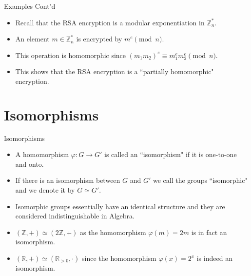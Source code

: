 \documentclass[ %
 10pt, xcolor={dvipsnames,svgnames,x11names,hyperref},
   hyperref={colorlinks=true,citecolor=green,linkcolor=DarkRed,urlcolor=ProcessBlue,anchorcolor=blue}
  ]{beamer}
\newenvironment{stepitemize}{\begin{itemize}[<+->]}{\end{itemize} }
\newcommand{\Z}{\mathbb{Z}}
\newcommand{\R}{\mathbb{R}}
\begin{document}
\begin{frame}{Examples Cont'd}
    \begin{stepitemize}
\item Recall that the RSA encryption is a modular exponentiation in $\Z_n^{*}$.
\item An element $m\in \Z_n^*$ is encrypted by $m^e 
\pmod{n}$.
\item This operation is homomorphic since $(m_1m_2)^e \equiv m_1^em_2^e \pmod{n}$.
\item This shows that the RSA encryption is a ``partially homomorphic" encryption. 

\end{stepitemize}
    
\end{frame}

\section{Isomorphisms}
\begin{frame}{Isomorphisms}
\begin{stepitemize}
\item  A homomorphism $\varphi:G\rightarrow G'$ is called an ``isomorphism" if it is one-to-one and onto.
\item If there is an isomorphism between $G$ and $G'$ we call the groups ``isomorphic" and we denote it by $G\simeq G'$.
\item  Isomorphic groups essentially have an identical structure and they are considered indistinguishable in Algebra. 
 \item $(\Z, +) \simeq (2\Z, +)$ as the homomorphism $\varphi(m)=2m$ is in fact an isomorphism. 
     \item $(\R, +) \simeq (\R_{>0},\cdot)$ since the homomorphism $\varphi(x) = 2^x$ is indeed an isomorphism.
\end{stepitemize}
\end{frame}
\end{document}
